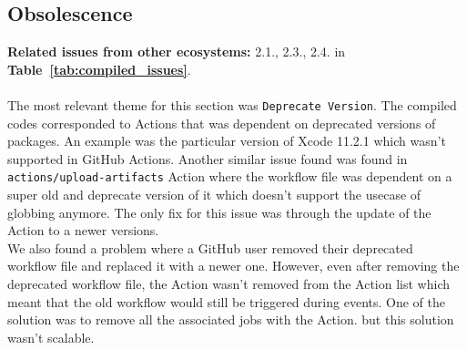 \documentclass[conference]{IEEEtran}
\begin{document}
\subsection*{\textbf{Obsolescence}}
\textbf{Related issues from other ecosystems:} 2.1., 2.3., 2.4. in \textbf{Table~\ref{tab:compiled_issues}}.\\\\
The most relevant theme for this section was \texttt{Deprecate Version}. The compiled codes corresponded  to Actions that was dependent on deprecated versions of packages. An example was the particular version of Xcode 11.2.1 which wasn't supported in GitHub Actions. Another similar issue found was found in \texttt{actions/upload-artifacts} Action where the workflow file was dependent on a super old and deprecate version of it which doesn't support the usecase of globbing anymore. The only fix for this issue was through the update of the Action to a newer versions. \\
	We also found a problem where a GitHub user removed their deprecated workflow file and replaced it with a newer one. However, even after removing the deprecated workflow file, the Action wasn't removed from the Action list which meant that the old workflow would still be triggered during events. One of the solution was to remove all the associated jobs with the Action. but this solution wasn't scalable.
\end{document}
